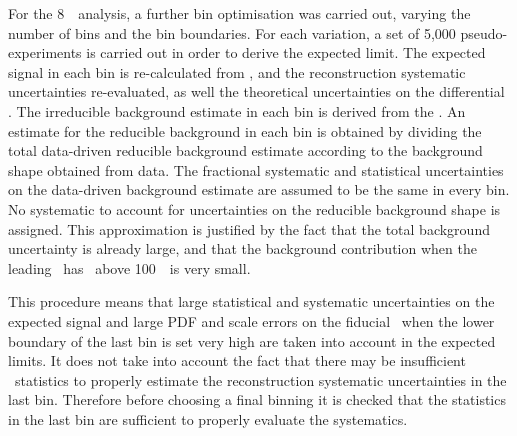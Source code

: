 For the 8~\tev\ analysis, a further bin optimisation was carried out, varying
the number of bins and the bin boundaries. For each variation, a set of 5,000
pseudo-experiments is carried out in order to derive the expected limit. The
expected signal in each bin is re-calculated from \mc, and the reconstruction
systematic uncertainties re-evaluated, as well the theoretical uncertainties on
the differential \cx. The irreducible background estimate in each bin is derived from the
\mc. An estimate for the reducible background in each bin is obtained by dividing the total
data-driven reducible background estimate according to the background shape obtained from data. The
fractional systematic and statistical uncertainties on the data-driven background
estimate are assumed to be the same in every bin. No systematic to
account for uncertainties on the reducible background shape is assigned. This
approximation is justified by the fact that the total background uncertainty is
already large, and that the background contribution when the leading \Z\ has
\pt\ above 100~\gev\ is very small.

This procedure means that large statistical and systematic uncertainties on the
expected signal and large PDF and scale errors on the fiducial \cx\ when the
lower boundary of the last bin is set
very high are taken into account in the expected limits. It does
not take into account the fact that there may be insufficient \mc\
statistics to properly estimate the reconstruction systematic uncertainties in the last bin. Therefore
before choosing a final binning it is checked that the statistics in the last
bin are sufficient to properly evaluate the systematics.

